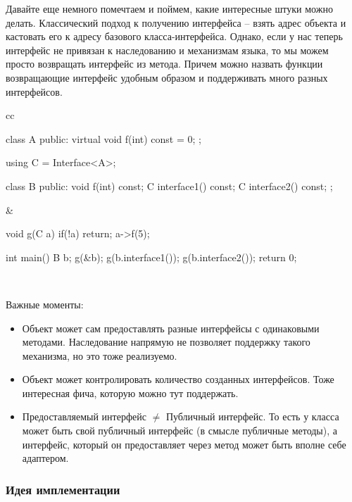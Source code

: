 Давайте еще немного помечтаем и поймем, какие интересные штуки можно делать.
Классический подход к получению интерфейса -- взять адрес объекта и кастовать его к адресу базового класса-интерфейса.
Однако, если у нас теперь интерфейс не привязан к наследованию и механизмам языка, то мы можем просто возвращать интерфейс из метода.
Причем можно назвать функции возвращающие интерфейс удобным образом и поддерживать много разных интерфейсов.
\begin{center}
\begin{tabular}{cc}
{
\begin{minipage}[\baselineskip]{6cm}
\begin{cppcode}[numbers = none]
class A {
public:
  virtual void f(int) const = 0;
};

using C = Interface<A>;

class B {
public:
   void f(int) const;
   C interface1() const;
   C interface2() const;
};
\end{cppcode}
\end{minipage}
}&{
\begin{minipage}[\baselineskip]{4cm}
\begin{cppcode}[numbers = none]
void g(C a) {
  if(!a)
    return;
  a->f(5);
}

int main() {
  B b;
  g(&b);
  g(b.interface1());
  g(b.interface2());
  return 0;
}
\end{cppcode}
\end{minipage}
}\\
\end{tabular}
\end{center}
Важные моменты:
\begin{itemize}
\item Объект может сам предоставлять разные интерфейсы с одинаковыми методами.
Наследование напрямую не позволяет поддержку такого механизма, но это тоже реализуемо.

\item Объект может контролировать количество созданных интерфейсов.
Тоже интересная фича, которую можно тут поддержать.

\item Предоставляемый интерфейс $\neq$ Публичный интерфейс.
То есть у класса может быть свой публичный интерфейс (в смысле публичные методы), а интерфейс, который он предоставляет через метод может быть вполне себе адаптером.
\end{itemize}

\subsubsection{Идея имплементации}
\label{section::RefErasureIdea}

